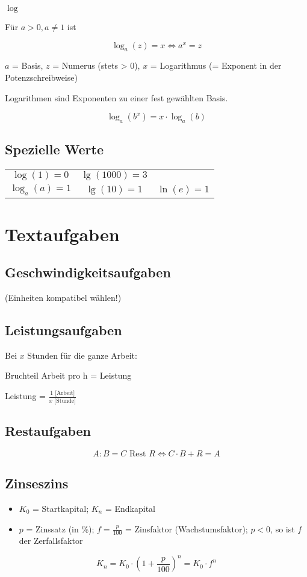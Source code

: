 \begin{multicols}{2}
\begin{definition*}{$\log$}{}

Für $a>0, a\ne 1$ ist

$$\log_a{}(z)=x \Longleftrightarrow{} a^x = z$$
\end{definition*}
$a$ = Basis, $z$ = Numerus (stets > 0), $x$ = Logarithmus (= Exponent in der Potenzschreibweise)

Logarithmen sind Exponenten zu einer fest gewählten Basis.

\begin{gesetz*}{}{}
$$\log_a(b^x) = x\cdot{}\log_a(b)$$
\end{gesetz*}

\subsection*{Spezielle Werte}
\begin{tabular}{ccc}
$\log(1)=0$     &    $\lg(1000)=3$           &\\
$\log_a(a) = 1$ & $\lg(10) = 1$ & $\ln(e) = 1$\\
\end{tabular}


\hrulefill
\section*{Textaufgaben}

\subsection*{Geschwindigkeitsaufgaben}
 (Einheiten kompatibel wählen!)

\subsection*{Leistungsaufgaben}
Bei $x$ Stunden für die ganze Arbeit:

Bruchteil Arbeit pro h = Leistung

Leistung = $\frac{1 \textrm{ [Arbeit]}}{x \textrm{ [Stunde]}}$

\subsection*{Restaufgaben}
$$A:B = C \textrm{ Rest } R \Longleftrightarrow{}  C\cdot{}B+R = A$$

\subsection*{Zinseszins}
\begin{itemize}
\item $K_0$ = Startkapital; $K_n$ = Endkapital
\item $p$ = Zinssatz (in \%); $f = \frac{p}{100}$ = Zinsfaktor
(Wachstumsfaktor); $p<0$, so ist $f$ der Zerfallsfaktor
\end{itemize}
$$K_n = K_0 \cdot{} \left( 1+\frac{p}{100} \right)^n = K_0\cdot{}f^n$$


\end{multicols}
